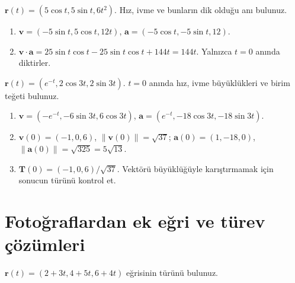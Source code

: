 \begin{tcolorbox}[title={Örnek 3.16 | Tahtadaki hareket örneği},colframe=accent]\(\mathbf r(t)=(5\cos t,5\sin t,6t^2)\). Hız, ivme ve bunların dik olduğu anı bulunuz.
\par{}\end{tcolorbox}
\begin{tcolorbox}[title={Adım adım çözüm},colback=green!3!white,colframe=green]\begin{enumerate}
\item \(\mathbf v=(-5\sin t,5\cos t,12t)\), \(\mathbf a=(-5\cos t,-5\sin t,12)\).
\item \(\mathbf v\cdot\mathbf a=25\sin t\cos t-25\sin t\cos t+144t=144t\). Yalnızca \(t=0\) anında diktirler.
\end{enumerate}\end{tcolorbox}
\begin{tcolorbox}[title={Örnek 3.17 | Üstel ve trigonometrik hareket},colframe=accent]\(\mathbf r(t)=(e^{-t},2\cos3t,2\sin3t)\). \(t=0\) anında hız, ivme büyüklükleri ve birim teğeti bulunuz.
\par{}\end{tcolorbox}
\begin{tcolorbox}[title={Adım adım çözüm},colback=green!3!white,colframe=green]\begin{enumerate}
\item \(\mathbf v=(-e^{-t},-6\sin3t,6\cos3t)\), \(\mathbf a=(e^{-t},-18\cos3t,-18\sin3t)\).
\item \(\mathbf v(0)=(-1,0,6)\), \(\|\mathbf v(0)\|=\sqrt{37}\); \(\mathbf a(0)=(1,-18,0)\), \(\|\mathbf a(0)\|=\sqrt{325}=5\sqrt{13}\).
\item \(\mathbf T(0)=(-1,0,6)/\sqrt{37}\). Vektörü büyüklüğüyle karıştırmamak için sonucun türünü kontrol et.
\end{enumerate}\end{tcolorbox}
\section{Fotoğraflardan ek eğri ve türev çözümleri}
\begin{tcolorbox}[title={Örnek 3.18 | Parametrik eğrinin türü},colframe=accent]\(\mathbf r(t)=(2+3t,4+5t,6+4t)\) eğrisinin türünü bulunuz.
\par{}\end{tcolorbox}
